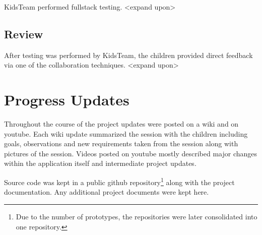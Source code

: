 KidsTeam performed fullstack testing. <expand upon>

\subsection{Review}\label{sec:reviewphase}

After testing was performed by KidsTeam, the children provided direct feedback via one of the collaboration techniques. <expand upon>

\section{Progress Updates}
Throughout the course of the project updates were posted on a wiki and on youtube. Each wiki update summarized the session with the children including goals, observations and new requirements taken from the session along with pictures of the session. Videos posted on youtube mostly described major changes within the application itself and intermediate project updates.

Source code was kept in a public github repository\footnote{Due to the number of prototypes, the repositories were later consolidated into one repository.} along with the project documentation. Any additional project documents were kept here. 

